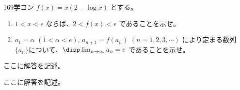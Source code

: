 \begin{thm}{169}{}{学コン}
 $f(x)=x(2-\log x)$ とする。
 \begin{enumerate}
  \item $1<x<e$ ならば、$2<f(x)<e$ であることを示せ。
  \item $a_1=\alpha$ $(1<\alpha <e)$, $a_{n+1}=f(a_n)$ $(n=1, 2, 3, \cdots)$ により定まる数列$\{a_n\}$について、$\disp \lim_{n\to\infty} a_n = e$ であることを示せ。
 \end{enumerate}
\end{thm}

ここに解答を記述。

ここに解答を記述。